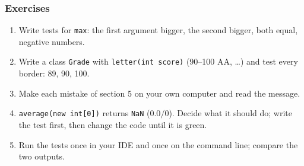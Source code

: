 \documentclass[aspectratio=169,10pt,compress]{beamer}
\begin{document}
\begin{frame}[t,fragile] \frametitle{Exercises}
  \begin{enumerate}\small
    \item Write tests for \texttt{max}: the first argument bigger, the second bigger, both equal, negative numbers.
    \item Write a class \texttt{Grade} with \texttt{letter(int score)} (90--100 AA, \dots) and test every border: 89, 90, 100.
    \item Make each mistake of section 5 on your own computer and read the message.
    \item \texttt{average(new int[0])} returns \texttt{NaN} ($0.0 / 0$). Decide what it should do; write the test first, then change the code until it is green.
    \item Run the tests once in your IDE and once on the command line; compare the two outputs.
  \end{enumerate}
\end{frame}




\begin{frame}[t,fragile]
	\begin{center}
		\vspace{4cm}
	\end{center}
\end{frame}
\end{document}
